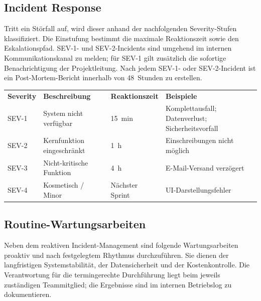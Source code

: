 \subsection{Incident Response}

Tritt ein Störfall auf, wird dieser anhand der nachfolgenden Severity-Stufen klassifiziert. Die Einstufung bestimmt die maximale Reaktionszeit sowie den Eskalationspfad. SEV-1- und SEV-2-Incidents sind umgehend im internen Kommunikationskanal zu melden; für SEV-1 gilt zusätzlich die sofortige Benachrichtigung der Projektleitung. Nach jedem SEV-1- oder SEV-2-Incident ist ein Post-Mortem-Bericht innerhalb von 48~Stunden zu erstellen.

\begin{tabularx}{\textwidth}{C{1.5cm} L{3.5cm} C{2.2cm} X}
  \color{white}\textbf{Severity} & \color{white}\textbf{Beschreibung} & \color{white}\textbf{Reaktionszeit} & \color{white}\textbf{Beispiele} \\
  SEV-1 & System nicht verfügbar & 15~min & Komplettausfall; Datenverlust; Sicherheitsvorfall \\
  SEV-2 & Kernfunktion eingeschränkt & 1~h & Einschreibungen nicht möglich \\
  SEV-3 & Nicht-kritische Funktion & 4~h & E-Mail-Versand verzögert \\
  SEV-4 & Kosmetisch / Minor & Nächster Sprint & UI-Darstellungsfehler \\
\end{tabularx}

\subsection{Routine-Wartungsarbeiten}

Neben dem reaktiven Incident-Management sind folgende Wartungsarbeiten proaktiv und nach festgelegtem Rhythmus durchzuführen. Sie dienen der langfristigen Systemstabilität, der Datensicherheit und der Kostenkontrolle. Die Verantwortung für die termingerechte Durchführung liegt beim jeweils zuständigen Teammitglied; die Ergebnisse sind im internen Betriebslog zu dokumentieren.

